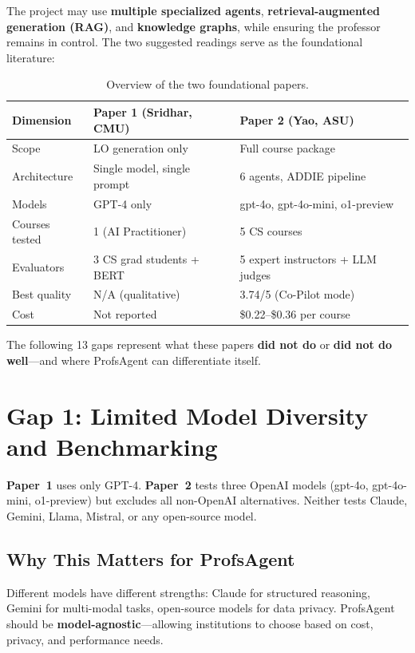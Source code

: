 \documentclass[11pt,a4paper]{article}
\begin{document}
The project may use \textbf{multiple specialized agents}, \textbf{retrieval-augmented generation (RAG)}, and \textbf{knowledge graphs}, while ensuring the professor remains in control. The two suggested readings serve as the foundational literature:

\begin{table}[H]
\centering
\caption{Overview of the two foundational papers.}
\begin{tabular}{@{}lp{5cm}p{5cm}@{}}
\toprule
\textbf{Dimension} & \textbf{Paper 1 (Sridhar, CMU)} & \textbf{Paper 2 (Yao, ASU)} \\
\midrule
Scope & LO generation only & Full course package \\
Architecture & Single model, single prompt & 6 agents, ADDIE pipeline \\
Models & GPT-4 only & gpt-4o, gpt-4o-mini, o1-preview \\
Courses tested & 1 (AI Practitioner) & 5 CS courses \\
Evaluators & 3 CS grad students + BERT & 5 expert instructors + LLM judges \\
Best quality & N/A (qualitative) & 3.74/5 (Co-Pilot mode) \\
Cost & Not reported & \$0.22--\$0.36 per course \\
\bottomrule
\end{tabular}
\end{table}

The following 13 gaps represent what these papers \textbf{did not do} or \textbf{did not do well}---and where ProfsAgent can differentiate itself.

\section{Gap 1: Limited Model Diversity and Benchmarking}

\textbf{Paper~1} uses only GPT-4. \textbf{Paper~2} tests three OpenAI models (gpt-4o, gpt-4o-mini, o1-preview) but excludes all non-OpenAI alternatives. Neither tests Claude, Gemini, Llama, Mistral, or any open-source model.

\subsection{Why This Matters for ProfsAgent}
Different models have different strengths: Claude for structured reasoning, Gemini for multi-modal tasks, open-source models for data privacy. ProfsAgent should be \textbf{model-agnostic}---allowing institutions to choose based on cost, privacy, and performance needs.
\end{document}
